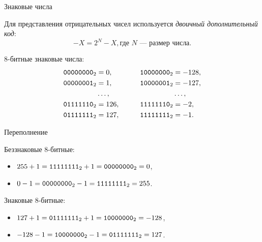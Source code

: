 \begin{frame}{Знаковые числа}

  Для представления отрицательных чисел используется \emph{двоичный
  дополнительный код}:
  \[ -X = 2^N - X, \text{где $N$~--- размер числа.}\]

  8-битные знаковые числа:
  \begin{align*}
    \mathtt{0000 0000}_2 &= 0,    &\qquad \mathtt{1000 0000}_2 &= -128, \\
    \mathtt{0000 0001}_2 &= 1,    &\qquad \mathtt{1000 0001}_2 &= -127, \\
                    &\ldots, &\qquad                 &\ldots, \\
    \mathtt{0111 1110}_2 &= 126,  &\qquad \mathtt{1111 1110}_2 &= -2,   \\
    \mathtt{0111 1111}_2 &= 127,  &\qquad \mathtt{1111 1111}_2 &= -1.
  \end{align*}


\end{frame}

\begin{frame}{Переполнение}

  Беззнаковые 8-битные:
  \begin{itemize}
    \item $255 + 1 = \mathtt{1111 1111}_2 + 1 = \mathtt{0000 0000}_2 = 0$,
    \item $0 - 1 = \mathtt{0000 0000}_2 - 1 = \mathtt{1111 1111}_2 = 255$.
  \end{itemize}

  Знаковые 8-битные:
  \begin{itemize}
    \item $127 + 1 = \mathtt{0111 1111}_2 + 1 = \mathtt{1000 0000}_2 = -128$,
    \item $-128 - 1 = \mathtt{1000 0000}_2 - 1 = \mathtt{0111 1111}_2 = 127$.
  \end{itemize}

\end{frame}

